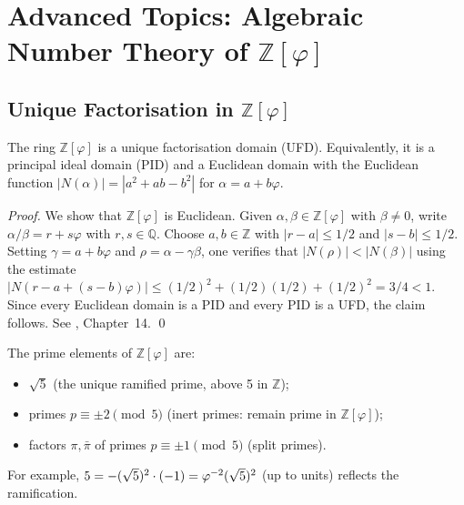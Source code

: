 \section{Advanced Topics: Algebraic Number Theory of \(\mathbb{Z}[\varphi]\)}
\label{sec:ch7-advanced}

\subsection{Unique Factorisation in \(\mathbb{Z}[\varphi]\)}
\label{subsec:ch7-ufd}

\begin{theorem}\label{thm:ufd}
The ring \(\mathbb{Z}[\varphi]\) is a unique factorisation domain (UFD).
Equivalently, it is a principal ideal domain (PID) and a Euclidean domain
with the Euclidean function \(|N(\alpha)| = |a^2 + ab - b^2|\) for
\(\alpha = a + b\varphi\).
\end{theorem}

\begin{proof}
We show that \(\mathbb{Z}[\varphi]\) is Euclidean.  Given
\(\alpha, \beta \in \mathbb{Z}[\varphi]\) with \(\beta \neq 0\),
write \(\alpha/\beta = r + s\varphi\) with \(r, s \in \mathbb{Q}\).
Choose \(a, b \in \mathbb{Z}\) with \(|r - a| \leq 1/2\) and
\(|s - b| \leq 1/2\).  Setting \(\gamma = a + b\varphi\) and
\(\rho = \alpha - \gamma\beta\), one verifies that
\(|N(\rho)| < |N(\beta)|\) using the estimate
\(|N(r-a+(s-b)\varphi)| \leq (1/2)^2 + (1/2)(1/2) + (1/2)^2 = 3/4 < 1\).
Since every Euclidean domain is a PID and every PID is a UFD, the claim
follows.  See \cite{hardy_wright}, Chapter~14.
\qed
\end{proof}

\begin{remark}
The prime elements of \(\mathbb{Z}[\varphi]\) are:
\begin{itemize}
  \item \(\sqrt{5}\) (the unique ramified prime, above 5 in \(\mathbb{Z}\));
  \item primes \(p \equiv \pm 2 \pmod{5}\) (inert primes: remain prime
        in \(\mathbb{Z}[\varphi]\));
  \item factors \(\pi, \bar{\pi}\) of primes \(p \equiv \pm 1 \pmod{5}\)
        (split primes).
\end{itemize}
For example, \(5 = -(\sqrt{5})^2 \cdot (-1) = \varphi^{-2}(\sqrt{5})^2\)
(up to units) reflects the ramification.
\end{remark}

